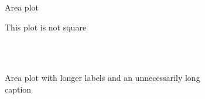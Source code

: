 \documentclass{article}
\begin{document}
\begin{figure}[ht]
    \vspace{-15ex}
    \begin{subfigure}{0.425\textwidth}
        \def\svgwidth{1\columnwidth}
        
        \vspace{1ex}
        \caption{Area plot}
    \end{subfigure}
    \hspace{-0.425\textwidth}
    \begin{subfigure}{0.425\textwidth}
        \vspace{-0.89\columnwidth}
        \def\svgwidth{0.1\columnwidth}
        
    \end{subfigure}
    \hfill
    \begin{subfigure}{0.425\textwidth}
        \vspace{-1\columnwidth}
        \hspace{0.5\columnwidth}
        \def\svgwidth{0.1\columnwidth}
        
    \end{subfigure}
    \hspace{-0.425\textwidth}
    \begin{subfigure}{0.425\textwidth}
        \def\svgwidth{1\columnwidth}
        
        \vspace{1ex}
        \caption{This plot is not square}
    \end{subfigure}\\
    \vspace{4ex}\\
    \begin{subfigure}{0.425\textwidth}
        \def\svgwidth{1\columnwidth}
        
        \vspace{1ex}
        \caption{Area plot with longer labels and an unnecessarily long caption}
    \end{subfigure}
    \hspace{-0.425\textwidth}
    \begin{subfigure}{0.425\textwidth}
        \vspace{-0.95\columnwidth}
        \def\svgwidth{0.1\columnwidth}
        
    \end{subfigure}
    \hspace{-0.0425\textwidth}
    \hfill
    \begin{subfigure}{0.425\textwidth}

\end{subfigure}
\end{figure}
\end{document}
